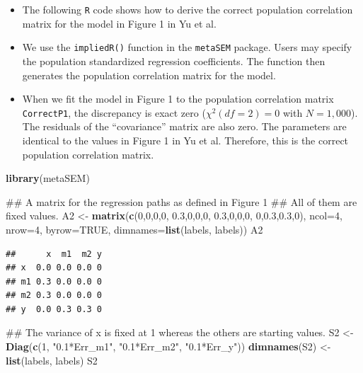 \documentclass[]{article}
\newenvironment{Shaded}{\begin{snugshade}}{\end{snugshade}}
\newcommand{\KeywordTok}[1]{\textcolor[rgb]{0.13,0.29,0.53}{\textbf{#1}}}
\newcommand{\DataTypeTok}[1]{\textcolor[rgb]{0.13,0.29,0.53}{#1}}
\newcommand{\DecValTok}[1]{\textcolor[rgb]{0.00,0.00,0.81}{#1}}
\newcommand{\FloatTok}[1]{\textcolor[rgb]{0.00,0.00,0.81}{#1}}
\newcommand{\StringTok}[1]{\textcolor[rgb]{0.31,0.60,0.02}{#1}}
\newcommand{\OtherTok}[1]{\textcolor[rgb]{0.56,0.35,0.01}{#1}}
\newcommand{\NormalTok}[1]{#1}
\providecommand{\tightlist}{%
  \setlength{\itemsep}{0pt}\setlength{\parskip}{0pt}}
\begin{document}
\begin{itemize}
\tightlist
\item
  The following \texttt{R} code shows how to derive the correct
  population correlation matrix for the model in Figure 1 in Yu et al.
\item
  We use the \texttt{impliedR()} function in the \texttt{metaSEM}
  package. Users may specify the population standardized regression
  coefficients. The function then generates the population correlation
  matrix for the model.
\item
  When we fit the model in Figure 1 to the population correlation matrix
  \texttt{CorrectP1}, the discrepancy is exact zero (\(\chi^2(df=2)=0\)
  with \(N=1,000\)). The residuals of the ``covariance'' matrix are also
  zero. The parameters are identical to the values in Figure 1 in Yu et
  al. Therefore, this is the correct population correlation matrix.
\end{itemize}

\begin{Shaded}
\begin{Highlighting}[]
\KeywordTok{library}\NormalTok{(metaSEM)}

\NormalTok{## A matrix for the regression paths as defined in Figure 1}
\NormalTok{## All of them are fixed values.}
\NormalTok{A2 <-}\StringTok{ }\KeywordTok{matrix}\NormalTok{(}\KeywordTok{c}\NormalTok{(}\DecValTok{0}\NormalTok{,}\DecValTok{0}\NormalTok{,}\DecValTok{0}\NormalTok{,}\DecValTok{0}\NormalTok{,}
               \FloatTok{0.3}\NormalTok{,}\DecValTok{0}\NormalTok{,}\DecValTok{0}\NormalTok{,}\DecValTok{0}\NormalTok{,}
               \FloatTok{0.3}\NormalTok{,}\DecValTok{0}\NormalTok{,}\DecValTok{0}\NormalTok{,}\DecValTok{0}\NormalTok{,}
               \DecValTok{0}\NormalTok{,}\FloatTok{0.3}\NormalTok{,}\FloatTok{0.3}\NormalTok{,}\DecValTok{0}\NormalTok{), }\DataTypeTok{ncol=}\DecValTok{4}\NormalTok{, }\DataTypeTok{nrow=}\DecValTok{4}\NormalTok{, }\DataTypeTok{byrow=}\OtherTok{TRUE}\NormalTok{,}
             \DataTypeTok{dimnames=}\KeywordTok{list}\NormalTok{(labels, labels))}
\NormalTok{A2}
\end{Highlighting}
\end{Shaded}

\begin{verbatim}
##      x  m1  m2 y
## x  0.0 0.0 0.0 0
## m1 0.3 0.0 0.0 0
## m2 0.3 0.0 0.0 0
## y  0.0 0.3 0.3 0
\end{verbatim}

\begin{Shaded}
\begin{Highlighting}[]
\NormalTok{## The variance of x is fixed at 1 whereas the others are starting values.}
\NormalTok{S2 <-}\StringTok{ }\KeywordTok{Diag}\NormalTok{(}\KeywordTok{c}\NormalTok{(}\DecValTok{1}\NormalTok{, }\StringTok{"0.1*Err_m1"}\NormalTok{, }\StringTok{"0.1*Err_m2"}\NormalTok{, }\StringTok{"0.1*Err_y"}\NormalTok{))}
\KeywordTok{dimnames}\NormalTok{(S2) <-}\StringTok{ }\KeywordTok{list}\NormalTok{(labels, labels)}
\NormalTok{S2}
\end{Highlighting}
\end{Shaded}
\end{document}

